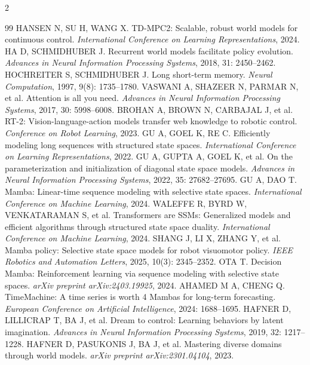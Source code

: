 \begin{multicols}{2}
\vskip 3pt
 {\fontsize{7.8pt}{9.4pt}\selectfont
\begin{thebibliography}{99} \vskip 7pt
\setlength{\parskip}{-2pt}
HANSEN N, SU H, WANG X. TD-MPC2: Scalable, robust world models for continuous control. {\it International Conference on Learning Representations}, 2024.
HA D, SCHMIDHUBER J. Recurrent world models facilitate policy evolution. {\it Advances in Neural Information Processing Systems}, 2018, 31: 2450--2462.
HOCHREITER S, SCHMIDHUBER J. Long short-term memory. {\it Neural Computation}, 1997, 9(8): 1735--1780.
VASWANI A, SHAZEER N, PARMAR N, et al. Attention is all you need. {\it Advances in Neural Information Processing Systems}, 2017, 30: 5998--6008.
BROHAN A, BROWN N, CARBAJAL J, et al. RT-2: Vision-language-action models transfer web knowledge to robotic control. {\it Conference on Robot Learning}, 2023.
GU A, GOEL K, RE C. Efficiently modeling long sequences with structured state spaces. {\it International Conference on Learning Representations}, 2022.
GU A, GUPTA A, GOEL K, et al. On the parameterization and initialization of diagonal state space models. {\it Advances in Neural Information Processing Systems}, 2022, 35: 27682--27695.
GU A, DAO T. Mamba: Linear-time sequence modeling with selective state spaces. {\it International Conference on Machine Learning}, 2024.
WALEFFE R, BYRD W, VENKATARAMAN S, et al. Transformers are SSMs: Generalized models and efficient algorithms through structured state space duality. {\it International Conference on Machine Learning}, 2024.
SHANG J, LI X, ZHANG Y, et al. Mamba policy: Selective state space models for robot visuomotor policy. {\it IEEE Robotics and Automation Letters}, 2025, 10(3): 2345--2352.
OTA T. Decision Mamba: Reinforcement learning via sequence modeling with selective state spaces. {\it arXiv preprint arXiv:2403.19925}, 2024.
AHAMED M A, CHENG Q. TimeMachine: A time series is worth 4 Mambas for long-term forecasting. {\it European Conference on Artificial Intelligence}, 2024: 1688--1695.
HAFNER D, LILLICRAP T, BA J, et al. Dream to control: Learning behaviors by latent imagination. {\it Advances in Neural Information Processing Systems}, 2019, 32: 1217--1228.
HAFNER D, PASUKONIS J, BA J, et al. Mastering diverse domains through world models. {\it arXiv preprint arXiv:2301.04104}, 2023.

\end{thebibliography}}
\end{multicols}
